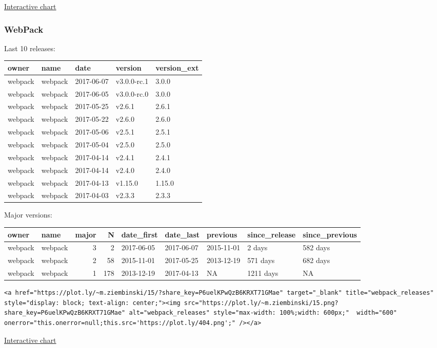 \href{https://plot.ly/~m.ziembinski/13/}{Interactive chart}

\subsubsection{WebPack}\label{webpack}

Last 10 releases:

\begin{longtable}[]{@{}lllll@{}}
\toprule
owner & name & date & version & version\_ext\tabularnewline
\midrule
\endhead
webpack & webpack & 2017-06-07 & v3.0.0-rc.1 & 3.0.0\tabularnewline
webpack & webpack & 2017-06-05 & v3.0.0-rc.0 & 3.0.0\tabularnewline
webpack & webpack & 2017-05-25 & v2.6.1 & 2.6.1\tabularnewline
webpack & webpack & 2017-05-22 & v2.6.0 & 2.6.0\tabularnewline
webpack & webpack & 2017-05-06 & v2.5.1 & 2.5.1\tabularnewline
webpack & webpack & 2017-05-04 & v2.5.0 & 2.5.0\tabularnewline
webpack & webpack & 2017-04-14 & v2.4.1 & 2.4.1\tabularnewline
webpack & webpack & 2017-04-14 & v2.4.0 & 2.4.0\tabularnewline
webpack & webpack & 2017-04-13 & v1.15.0 & 1.15.0\tabularnewline
webpack & webpack & 2017-04-03 & v2.3.3 & 2.3.3\tabularnewline
\bottomrule
\end{longtable}

Major versions:

\begin{longtable}[]{@{}llrrlllll@{}}
\toprule
owner & name & major & N & date\_first & date\_last & previous &
since\_release & since\_previous\tabularnewline
\midrule
\endhead
webpack & webpack & 3 & 2 & 2017-06-05 & 2017-06-07 & 2015-11-01 & 2
days & 582 days\tabularnewline
webpack & webpack & 2 & 58 & 2015-11-01 & 2017-05-25 & 2013-12-19 & 571
days & 682 days\tabularnewline
webpack & webpack & 1 & 178 & 2013-12-19 & 2017-04-13 & NA & 1211 days &
NA\tabularnewline
\bottomrule
\end{longtable}

\begin{verbatim}
<a href="https://plot.ly/~m.ziembinski/15/?share_key=P6uelKPwQzB6KRXT71GMae" target="_blank" title="webpack_releases" style="display: block; text-align: center;"><img src="https://plot.ly/~m.ziembinski/15.png?share_key=P6uelKPwQzB6KRXT71GMae" alt="webpack_releases" style="max-width: 100%;width: 600px;"  width="600" onerror="this.onerror=null;this.src='https://plot.ly/404.png';" /></a>
\end{verbatim}

\href{https://plot.ly/~m.ziembinski/15/}{Interactive chart}

